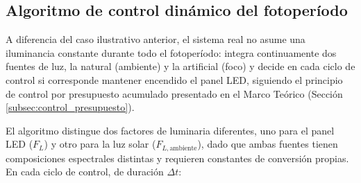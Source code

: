 \subsection{Algoritmo de control dinámico del fotoperíodo}
\label{subsec:algoritmo_control_dli}

A diferencia del caso ilustrativo anterior, el sistema real no asume una iluminancia constante durante todo el fotoperíodo: integra continuamente dos fuentes de luz, la natural (ambiente) y la artificial (foco) y decide en cada ciclo de control si corresponde mantener encendido el panel LED, siguiendo el principio de control por presupuesto acumulado presentado en el Marco Teórico (Sección \ref{subsec:control_presupuesto}).

El algoritmo distingue dos factores de luminaria diferentes, uno para el panel LED ($F_L$) y otro para la luz solar ($F_{L,\text{ambiente}}$), dado que ambas fuentes tienen composiciones espectrales distintas y requieren constantes de conversión propias. En cada ciclo de control, de duración $\Delta t$:

